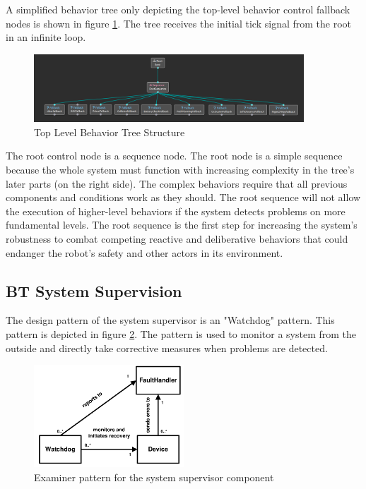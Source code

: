 A simplified behavior tree only depicting the top-level behavior control fallback nodes is shown in figure \ref{fig:top_level_bt}. The tree receives the initial tick signal from the root in an infinite loop. 

\begin{figure}[ht]
	\centering
	\includegraphics[width=0.9\textwidth]{images/simplified_bt.png}
	\caption{Top Level Behavior Tree Structure}
	\label{fig:top_level_bt}
\end{figure}

The root control node is a sequence node. The root node is a simple sequence because the whole system must function with increasing complexity in the tree's later parts (on the right side). The complex behaviors require that all previous components and conditions work as they should. The root sequence will not allow the execution of higher-level behaviors if the system detects problems on more fundamental levels. The root sequence is the first step for increasing the system's robustness to combat competing reactive and deliberative behaviors that could endanger the robot's safety and other actors in its environment. 

\subsection{BT System Supervision}
\label{subsec:BT System Supervision}

The design pattern of the system supervisor is an "Watchdog" pattern. This pattern is depicted in figure \ref{fig:watchdog_pattern}. The pattern is used to monitor a system from the outside and directly take corrective measures when problems are detected. 

\begin{figure}[ht]
	\centering
	\includegraphics[width=0.5\textwidth]{images/watchdog_pattern.png}
	\caption{Examiner pattern for the system supervisor component \cite{konrad2003defining}}
	\label{fig:watchdog_pattern}
\end{figure}

